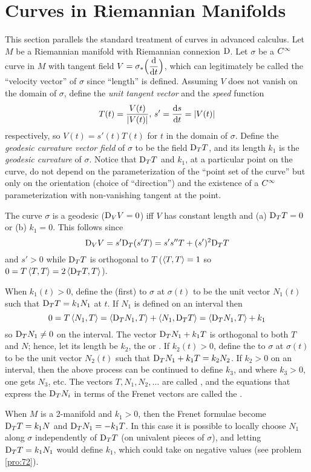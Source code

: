 \documentclass[../main]{subfiles}
\begin{document}
\section{Curves in Riemannian Manifolds}\label{ch06:s3}

This section parallels the standard treatment of curves in advanced calculus. Let $M$ be a Riemannian manifold with Riemannian connexion $\mathrm{D}$. Let $\sigma$ be a $C^\infty$ curve in $M$ with tangent field $V=\sigma_*\Big(\dv{}{t}\Big)$, which can legitimately be called the ``velocity vector'' of $\sigma$ since ``length'' is defined. Assuming $V$ does not vanish on the domain of $\sigma$, define the \emph{unit tangent vector} and  the \emph{speed} function
\[T(t)=\frac{V(t)}{\left|V(t)\right|}, \, s'=\dfrac{\mathrm{d}s}{\mathrm{d}t} = \left|V(t)\right|\]
respectively, so $V(t)=s'(t)T(t)$ for $t$ in the domain of $\sigma$. Define the \emph{geodesic curvature vector field} of $\sigma$ to be the field $\mathrm{D}_TT$, and its length $k_1$ is the \emph{geodesic curvature} of $\sigma$. Notice that $\mathrm{D}_TT$ and $k_1$, at a particular point on the curve, do not depend on the parameterization of the ``point set of the curve'' but only on the orientation (choice of ``direction'') and the existence of a $C^\infty$ parameterization with non-vanishing tangent at the point.

The curve $\sigma$ is a geodesic ($\mathrm{D}_VV=0$) iff $V$ has constant length and (a) $\mathrm{D}_TT=0$ or (b) $k_1=0$. This follows since
\[\mathrm{D}_VV = s'\mathrm{D}_T(s'T) = s's''T+(s')^2\mathrm{D}_TT\]
and $s'>0$ while $\mathrm{D}_TT$ is orthogonal to $T$ ($\left\langle T,T\right\rangle=1$ so \newline $0=T\left\langle T,T\right\rangle=2\left\langle\mathrm{D}_TT,T\right\rangle$).

When $k_1(t)>0$, define the (first)  to $\sigma$ at $\sigma(t)$ to be the unit vector $N_1(t)$ such that $\mathrm{D}_TT=k_1N_1$ at $t$. If $N_1$ is defined on an interval then
\[0 = T\left\langle N_1,T\right\rangle = \left\langle\mathrm{D}_TN_1,T\right\rangle+\left\langle N_1,\mathrm{D}_TT\right\rangle = \left\langle\mathrm{D}_TN_1,T\right\rangle+k_1\]
so $\mathrm{D}_TN_1\ne0$ on the interval. The vector $\mathrm{D}_TN_1+k_1T$ is orthogonal to both $T$ and $N$; hence, let its length be $k_2$, the  or . If $k_2(t)>0$, define the  to $\sigma$ at $\sigma(t)$ to be the unit vector $N_2(t)$ such that $\mathrm{D}_TN_1+k_1T=k_2N_2$. If $k_2>0$ on an interval, then the above process can be continued to define $k_3$, and where $k_3>0$, one gets $N_3$, etc. The vectors $T,N_1,N_2,\ldots$ are called , and the equations that express the $\mathrm{D}_TN_i$ in terms of the Frenet vectors are called the .

When $M$ is a 2-manifold and $k_1>0$, then the Frenet formulae become \newline $\mathrm{D}_TT=k_1N$ and $\mathrm{D}_TN_1=-k_1T$. In this case it is possible to locally choose $N_1$ along $\sigma$ independently of $\mathrm{D}_TT$ (on univalent pieces of $\sigma$), and letting $\mathrm{D}_TT=k_1N_1$ would define $k_1$, which could take on negative values (see problem \ref{pro:72}).
\end{document}
